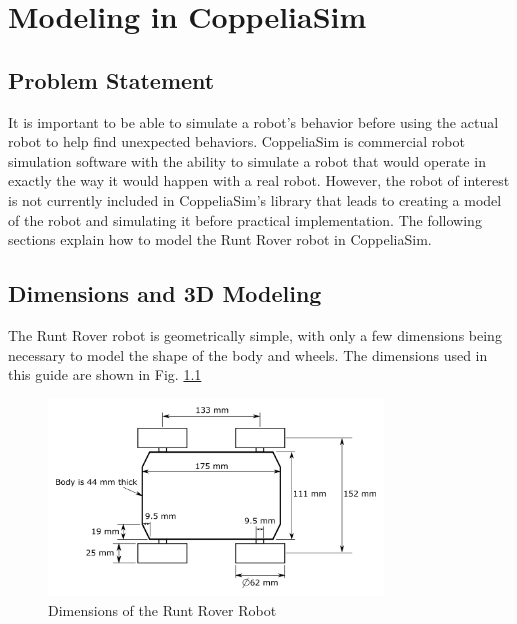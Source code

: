 \chapter{Modeling in CoppeliaSim}
\label{ch: coppSimModeling}

\section{Problem Statement}
It is important to be able to simulate a robot's behavior before using the
actual robot to help find unexpected behaviors. CoppeliaSim is commercial robot
simulation software with the ability to simulate a robot that would operate in
exactly the way it would happen with a real robot. However, the robot of
interest is not currently included in CoppeliaSim's library that leads to
creating a model of the robot and simulating it before practical implementation.
The following sections explain how to model the Runt Rover robot in CoppeliaSim.

\section{Dimensions and 3D Modeling}
The Runt Rover robot is geometrically simple, with only a few dimensions being necessary to model the shape of the body and wheels. The dimensions used in this guide are shown in Fig. \ref{fig:runtRoverDims}

\begin{figure}
    \centering
    \includegraphics[width=3.5in]{figs/img/runtRoverDimensions}
    \caption{Dimensions of the Runt Rover Robot}
    \label{fig:runtRoverDims}
\end{figure}

